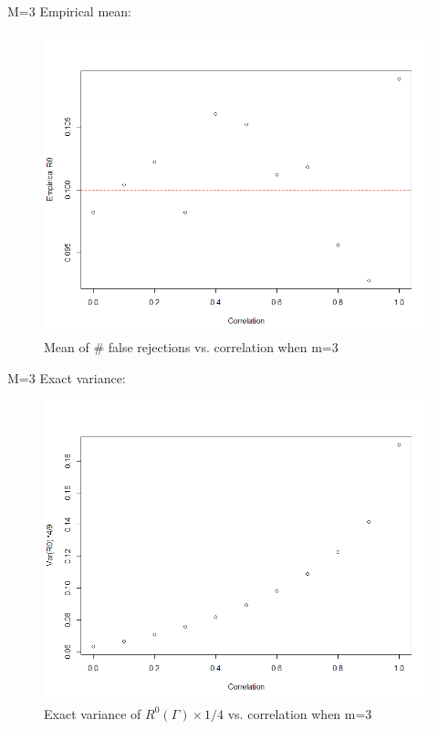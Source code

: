 \documentclass{beamer}
\begin{document}
\begin{frame}[t]{M=3}\vspace{10pt}
Empirical mean:
\begin{figure}[h]
	\centering
	\includegraphics[scale=0.35]{empirical_m=3}
	\caption{\footnotesize{Mean of \# false rejections vs. correlation when m=3}}
	\label{fig6}
\end{figure}
\end{frame}

\begin{frame}[t]{M=3}\vspace{10pt}
Exact variance:
\begin{figure}[h]
	\centering
	\includegraphics[scale=0.35]{exact_m=3_var}
	\caption{\footnotesize{Exact variance of $R^0(\Gamma) \times 1/4$ vs. correlation when m=3}}
	\label{fig7}
\end{figure}
\end{frame}
\end{document}
